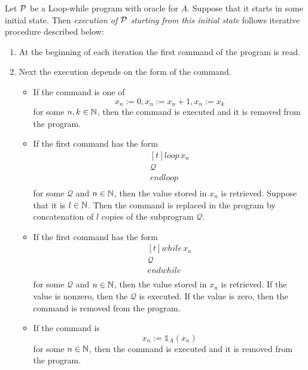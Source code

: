 \documentclass[10pt]{amsart}
\begin{document}
\begin{definition}
	Let ${\mathcal P}$ be a Loop-while program with oracle for $A$. Suppose that it starts in some initial state. Then \textit{execution of ${\mathcal P}$ starting from this initial state} follows iterative procedure described below:
	\begin{enumerate}[label=\textbf{(\arabic*)}, leftmargin=3.0em]
		\item At the beginning of each iteration the first command of the program is read.
		\item Next the execution depends on the form of the command.
		      \begin{itemize}
			      \item[] If the command is one of
				      $$x_n:=0,x_n:= x_n + 1,x_n:=x_k$$
				      for some $n,k\in {\mathbb N}$, then the command is executed and it is removed from the program.
			      \item[] If the first command has the form
				      $$\begin{aligned}[t]
						      \mathit{loop}\,x_n \\
						      \mathcal{Q}        \\
						      \mathit{endloop}   \\
					      \end{aligned}$$
				      for some $\mathcal{Q}$ and $n \in {\mathbb N}$, then the value stored in $x_n$ is retrieved. Suppose that it is $l \in {\mathbb N}$. Then the command is replaced in the program by concatenation of $l$ copies of the subprogram $\mathcal{Q}$.
			      \item[] If the first command has the form
				      $$\begin{aligned}[t]
						      \mathit{while}\,x_n \\
						      \mathcal{Q}         \\
						      \mathit{endwhile}   \\
					      \end{aligned}$$
				      for some $\mathcal{Q}$ and $n \in {\mathbb N}$, then the value stored in $x_n$ is retrieved. If the value is nonzero, then the $\mathcal{Q}$ is executed. If the value is zero, then the command is removed from the program.
			      \item[] If the command is
				      $$x_n:= \mathbb{1}_A(x_n)$$
				      for some $n \in {\mathbb N}$, then the command is executed and it is removed from the program.
		      \end{itemize}
	\end{enumerate}
\end{definition}
\end{document}
